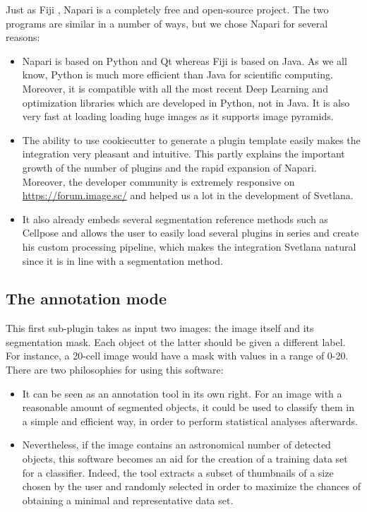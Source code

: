 \documentclass{article}
\begin{document}
Just as Fiji \cite{schindelin2012fiji}, Napari is a completely free and open-source project. The two programs are similar in a number of ways, but we chose Napari for several reasons:
\begin{itemize}
  \item Napari is based on Python and Qt whereas Fiji is based on Java. As we all know, Python is much more efficient than Java for scientific computing. Moreover, it is compatible with all the most recent Deep Learning and optimization libraries which are developed in Python, not in Java. It is also very fast at loading loading huge images as it supports image pyramids.
  \item The ability to use cookiecutter to generate a plugin template easily makes the integration very pleasant and intuitive. This partly explains the important growth of the number of plugins and the rapid expansion of Napari. Moreover, the developer community is extremely responsive on \url{https://forum.image.sc/} and helped us a lot in the development of Svetlana.
  \item It also already embeds several segmentation reference methods such as Cellpose \cite{stringer2021cellpose} and allows the user to easily load several plugins in series and create his custom processing pipeline, which makes the integration Svetlana natural since it is in line with a segmentation method.
\end{itemize}

\subsection{The annotation mode}

This first sub-plugin takes as input two images: the image itself and its segmentation mask. Each object ot the latter should be given a different label. For instance, a 20-cell image would have a mask with values in a range of 0-20.
\\
There are two philosophies for using this software:
\begin{itemize}
  \item It can be seen as an annotation tool in its own right. For an image with a reasonable amount of segmented objects, it could be used to classify them in a simple and efficient way, in order to perform statistical analyses afterwards.
  \item Nevertheless, if the image contains an astronomical number of detected objects, this software becomes an aid for the creation of a training data set for a classifier. Indeed, the tool extracts a subset of thumbnails of a size chosen by the user and randomly selected in order to maximize the chances of obtaining a minimal and representative data set. 
\end{itemize}
\end{document}
